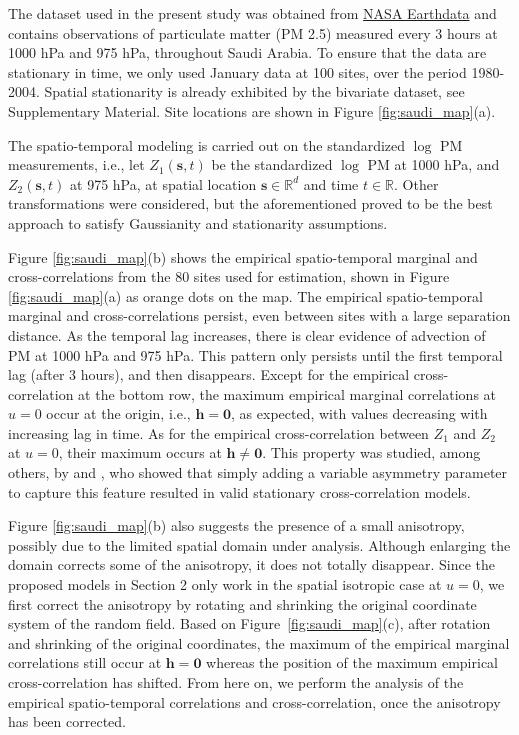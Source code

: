 \documentclass[12pt]{article}
\newcommand{\0}{\mathbf{0}}
\begin{document}
The dataset used in the present study was obtained from \href{https://goldsmr5.gesdisc.eosdis.nasa.gov/data/MERRA2/}{NASA Earthdata} and contains observations of particulate matter (PM 2.5) measured every 3 hours at 1000 hPa and 975 hPa, throughout Saudi Arabia. To ensure that the data are stationary in time, we only used January data at 100 sites, over the period 1980-2004. Spatial stationarity is already exhibited by the bivariate dataset, see Supplementary Material. Site locations are shown in Figure \ref{fig:saudi_map}(a). 

The spatio-temporal modeling is carried out on the standardized $\log $ PM measurements, i.e., let $Z_1(\mathbf{s},t)$ be the standardized $\log $ PM at 1000 hPa, and $Z_2(\mathbf{s},t)$ at 975 hPa, at spatial location $\mathbf{s} \in \mathbb{R}^d$ and time $t\in\mathbb{R}$. Other transformations were considered, but the aforementioned proved to be the best approach to satisfy Gaussianity and stationarity assumptions. 

Figure \ref{fig:saudi_map}(b) shows the empirical spatio-temporal marginal and cross-correlations from the 80 sites used for estimation, shown in Figure \ref{fig:saudi_map}(a) as orange dots on the map. The empirical spatio-temporal marginal and cross-correlations persist, even between sites with a large separation distance. As the temporal lag increases, there is clear evidence of advection of PM at 1000 hPa and 975 hPa. This pattern only persists until the first temporal lag (after 3 hours), and then disappears. Except for the empirical cross-correlation at the bottom row, the maximum empirical marginal correlations at $u=0$ occur at the origin, i.e., $\mathbf{h}=\mathbf{0}$, as expected, with values decreasing with increasing lag in time. As for the empirical cross-correlation between $Z_1$ and $Z_2$ at $u=0$, their maximum occurs at $\mathbf{h}\neq\mathbf{0}$. This property was studied, among others, by \citet{apanasovich2010cross} and \citet{li2011approach}, who showed that simply adding a variable asymmetry parameter to capture this feature resulted in valid stationary cross-correlation models.

Figure \ref{fig:saudi_map}(b) also suggests the presence of a small anisotropy, possibly due to the limited spatial domain under analysis. Although enlarging the domain corrects some of the anisotropy, it does not totally disappear. Since the proposed models in Section 2 only work in the spatial isotropic case at $u=0$, we first correct the anisotropy by rotating and shrinking the original coordinate system of the random field. Based on Figure~\ref{fig:saudi_map}(c), after rotation and shrinking of the original coordinates, the maximum of the empirical marginal correlations still occur at $\mathbf{h}=\mathbf{0}$ whereas the position of the maximum empirical cross-correlation has shifted. From here on, we perform the analysis of the empirical spatio-temporal correlations and cross-correlation, once the anisotropy has been corrected.
\end{document}
